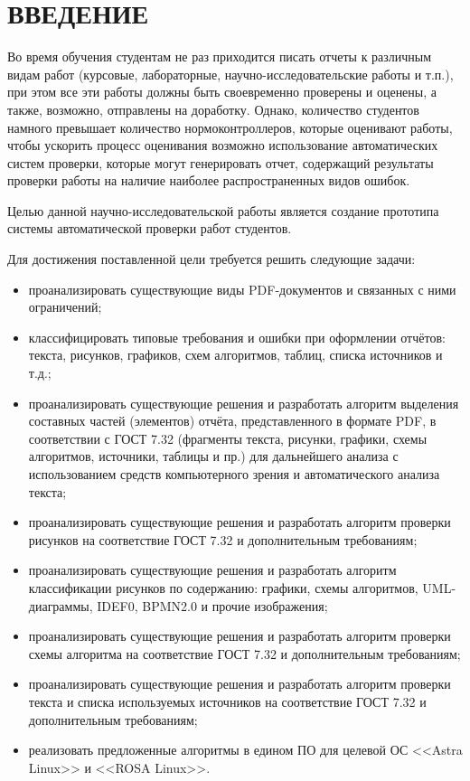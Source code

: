 \chapter*{ВВЕДЕНИЕ}

Во время обучения студентам не раз приходится писать отчеты к различным видам работ (курсовые, лабораторные, научно-исследовательские работы и т.п.), при этом все эти работы должны быть своевременно проверены и оценены, а также, возможно, отправлены на доработку. Однако, количество студентов намного превышает количество нормоконтроллеров, которые оценивают работы, чтобы ускорить процесс оценивания возможно использование автоматических систем проверки, которые могут генерировать отчет, содержащий результаты проверки работы на наличие наиболее распространенных видов ошибок.

Целью данной научно-исследовательской работы является создание прототипа системы автоматической проверки работ студентов.

Для достижения поставленной цели требуется решить следующие задачи:
\begin{itemize}
	\item проанализировать существующие виды PDF-документов и связанных с ними ограничений;
	\item классифицировать типовые требования и ошибки при оформлении отчётов: текста, рисунков, графиков, схем алгоритмов, таблиц, списка источников и т.д.;
	\item проанализировать существующие решения и разработать алгоритм выделения составных частей (элементов) отчёта, представленного в формате PDF, в соответствии с ГОСТ 7.32 (фрагменты текста, рисунки, графики, схемы алгоритмов, источники, таблицы и пр.) для дальнейшего анализа с использованием средств компьютерного зрения и автоматического анализа текста;
	\item проанализировать существующие решения и разработать алгоритм проверки рисунков на соответствие ГОСТ 7.32 и дополнительным требованиям;
	\item проанализировать существующие решения и разработать алгоритм классификации рисунков по содержанию: графики, схемы алгоритмов, UML-диаграммы, IDEF0, BPMN2.0 и прочие изображения;
	\item проанализировать существующие решения и разработать алгоритм проверки схемы алгоритма на соответствие ГОСТ 7.32 и дополнительным требованиям;
	\item проанализировать существующие решения и разработать алгоритм проверки текста и списка используемых источников на соответствие ГОСТ 7.32 и дополнительным требованиям;
	\item реализовать предложенные алгоритмы в едином ПО для целевой ОС <<Astra Linux>> и <<ROSA Linux>>.
\end{itemize}
